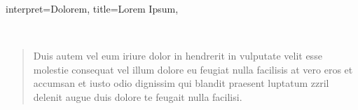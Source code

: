 \begin{song}{
interpret={Dolorem},
title={Lorem Ipsum},
}
\begin{verse*}
{\makebox[\tabcellwidth]{\tabotherformat{|}}\makebox[2\tabcellwidth]{\tabruleformat{\rule[0.5ex]{1.4\tabcellwidth}{0.3pt}}}\makebox[14\tabcellwidth]{\tabruleformat{\rule[0.5ex]{13.4\tabcellwidth}{0.3pt}}}\makebox[\tabcellwidth]{\tabotherformat{|}}\makebox[17\tabcellwidth]{\tabruleformat{\rule[0.5ex]{16.4\tabcellwidth}{0.3pt}}}\makebox[\tabcellwidth]{\tabotherformat{|}}\makebox[2\tabcellwidth]{\tabruleformat{\rule[0.5ex]{1.4\tabcellwidth}{0.3pt}}}\makebox[14\tabcellwidth]{\tabruleformat{\rule[0.5ex]{13.4\tabcellwidth}{0.3pt}}}\makebox[\tabcellwidth]{\tabotherformat{|}}\makebox[17\tabcellwidth]{\tabruleformat{\rule[0.5ex]{16.4\tabcellwidth}{0.3pt}}}\makebox[\tabcellwidth]{\tabotherformat{|}} \\
\makebox[4\tabcellwidth]{}\makebox[17\tabcellwidth]{}\makebox[17\tabcellwidth]{}\makebox[8\tabcellwidth]{}\makebox[8\tabcellwidth]{}
}
\end{verse*}

\begin{intro}
  \normalbar\space {} 
\end{intro}

\begin{verse}
  Duis autem vel eum iriure dolor in hendrerit in vulputate velit esse molestie \versebreak
{}consequat vel illum   dolore eu feugiat nulla facilisis at vero \versebreak
{}  eros et accumsan et iusto odio dignissim qui blandit praesent luptatum zzril \versebreak
\leftrepeat\space\nolinebreak {}delenit augue duis   dolore te feugait nulla facilisi.  \nolinebreak\rightrepeat
\end{verse}


\end{song}
